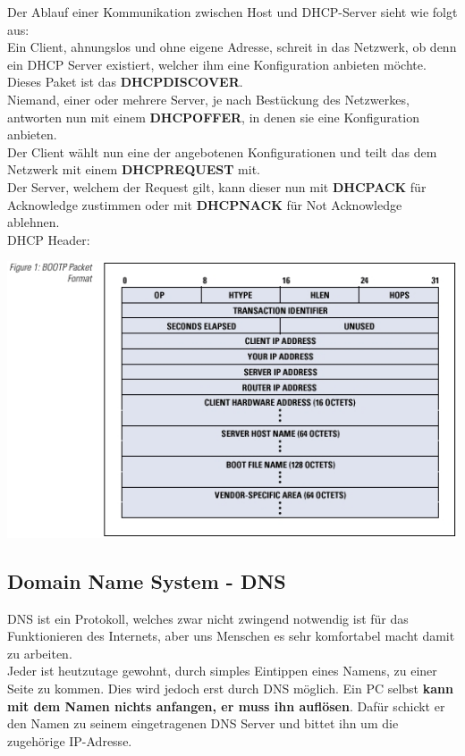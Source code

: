 \documentclass[12pt,a4paper]{report}
\begin{document}
Der Ablauf einer Kommunikation zwischen Host und DHCP-Server sieht wie folgt aus:\\
Ein Client, ahnungslos und ohne eigene Adresse, schreit in das Netzwerk, ob denn ein DHCP Server existiert, welcher ihm eine Konfiguration anbieten möchte. Dieses Paket ist das \textbf{DHCPDISCOVER}.\\
Niemand, einer oder mehrere Server, je nach Bestückung des Netzwerkes, antworten nun mit einem \textbf{DHCPOFFER}, in denen sie eine Konfiguration anbieten.\\
Der Client wählt nun eine der angebotenen Konfigurationen und teilt das dem Netzwerk mit einem \textbf{DHCPREQUEST} mit.\\
Der Server, welchem der Request gilt, kann dieser nun mit \textbf{DHCPACK} für Acknowledge zustimmen oder mit \textbf{DHCPNACK} für Not Acknowledge ablehnen.\\

DHCP Header:\\
\begin{center}
\includegraphics[scale=0.7]{../docs/tarkes/pics/dhcpheader.jpg}
\end{center}
\subsection{Domain Name System - DNS}
DNS ist ein Protokoll, welches zwar nicht zwingend notwendig ist für das Funktionieren des Internets, aber uns Menschen es sehr komfortabel macht damit zu arbeiten.\\
Jeder ist heutzutage gewohnt, durch simples Eintippen eines Namens, zu einer Seite zu kommen. Dies wird jedoch erst durch DNS möglich. Ein PC selbst \textbf{kann mit dem Namen nichts anfangen, er muss ihn auflösen}. Dafür schickt er den Namen zu seinem eingetragenen DNS Server und bittet ihn um die zugehörige IP-Adresse.\\
\end{document}
